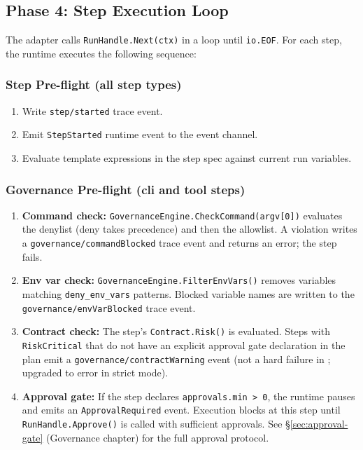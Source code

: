 \subsection{Phase 4: Step Execution Loop}

The adapter calls \texttt{RunHandle.Next(ctx)} in a loop until \texttt{io.EOF}.
For each step, the runtime executes the following sequence:

\subsubsection*{Step Pre-flight (all step types)}
\begin{enumerate}
  \item Write \texttt{step/started} trace event.
  \item Emit \texttt{StepStarted} runtime event to the event channel.
  \item Evaluate template expressions in the step spec against current run variables.
\end{enumerate}

\subsubsection*{Governance Pre-flight (cli and tool steps)}
\begin{enumerate}
  \item \textbf{Command check:} \texttt{GovernanceEngine.CheckCommand(argv[0])} evaluates
        the denylist (deny takes precedence) and then the allowlist. A violation writes a
        \texttt{governance/commandBlocked} trace event and returns an error; the step fails.
  \item \textbf{Env var check:} \texttt{GovernanceEngine.FilterEnvVars()} removes variables
        matching \texttt{deny\_env\_vars} patterns. Blocked variable names are written to the
        \texttt{governance/envVarBlocked} trace event.
  \item \textbf{Contract check:} The step's \texttt{Contract.Risk()} is evaluated. Steps
        with \texttt{RiskCritical} that do not have an explicit approval gate declaration
        in the plan emit a \texttt{governance/contractWarning} event (not a hard failure in
        ; upgraded to error in strict mode).
  \item \textbf{Approval gate:} If the step declares \texttt{approvals.min > 0}, the runtime
        pauses and emits an \texttt{ApprovalRequired} event. Execution blocks at this step
        until \texttt{RunHandle.Approve()} is called with sufficient approvals.
        See §\ref{sec:approval-gate} (Governance chapter) for the full approval protocol.
\end{enumerate}

